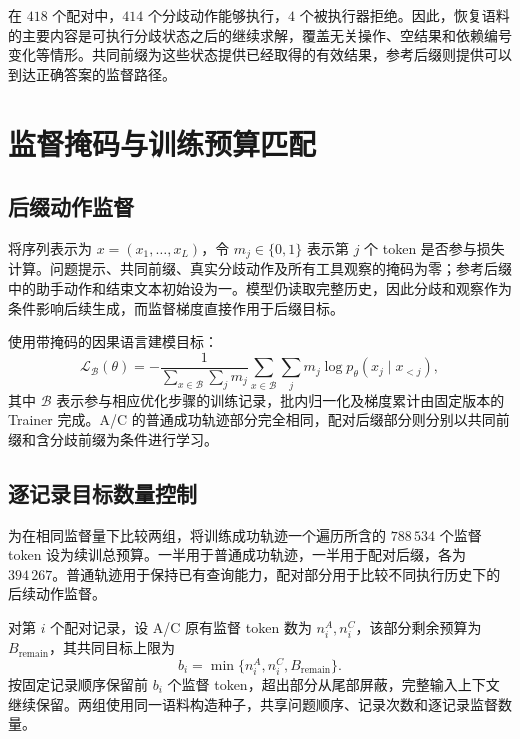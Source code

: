在 $418$ 个配对中，$414$ 个分歧动作能够执行，$4$ 个被执行器拒绝。因此，恢复语料的主要内容是可执行分歧状态之后的继续求解，覆盖无关操作、空结果和依赖编号变化等情形。共同前缀为这些状态提供已经取得的有效结果，参考后缀则提供可以到达正确答案的监督路径。

\section{监督掩码与训练预算匹配}

\subsection{后缀动作监督}

将序列表示为 $x=(x_1,\ldots,x_L)$，令 $m_j\in\{0,1\}$ 表示第 $j$ 个 token 是否参与损失计算。问题提示、共同前缀、真实分歧动作及所有工具观察的掩码为零；参考后缀中的助手动作和结束文本初始设为一。模型仍读取完整历史，因此分歧和观察作为条件影响后续生成，而监督梯度直接作用于后缀目标。

使用带掩码的因果语言建模目标：
\begin{equation}
  \mathcal{L}_{\mathcal B}(\theta)
   =-\frac{1}{\sum_{x\in\mathcal B}\sum_j m_j}
     \sum_{x\in\mathcal B}\sum_j
       m_j\log p_\theta(x_j\mid x_{<j}),
\end{equation}
其中 $\mathcal B$ 表示参与相应优化步骤的训练记录，批内归一化及梯度累计由固定版本的 Trainer 完成。A/C 的普通成功轨迹部分完全相同，配对后缀部分则分别以共同前缀和含分歧前缀为条件进行学习。

\subsection{逐记录目标数量控制}

为在相同监督量下比较两组，将训练成功轨迹一个遍历所含的 $788\,534$ 个监督 token 设为续训总预算。一半用于普通成功轨迹，一半用于配对后缀，各为 $394\,267$。普通轨迹用于保持已有查询能力，配对部分用于比较不同执行历史下的后续动作监督。

对第 $i$ 个配对记录，设 A/C 原有监督 token 数为 $n_i^A,n_i^C$，该部分剩余预算为 $B_{\mathrm{remain}}$，其共同目标上限为
\begin{equation}
  b_i=\min\{n_i^A,n_i^C,B_{\mathrm{remain}}\}.
\end{equation}
按固定记录顺序保留前 $b_i$ 个监督 token，超出部分从尾部屏蔽，完整输入上下文继续保留。两组使用同一语料构造种子，共享问题顺序、记录次数和逐记录监督数量。

\begin{table}[htbp]
  \centering
  \caption{A/C 续训语料构成。输入 token 为各记录输入长度之和。}
  \label{tab:matched-corpus}
  \PublicTrainingTable
\end{table}

